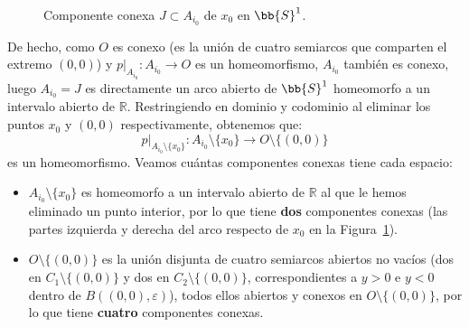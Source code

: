 \documentclass[12pt]{article}
\begin{document}
\begin{ejercicio}
\begin{enumerate}[label=\alph*)]
\begin{figure}[h]
                    \caption{Componente conexa $J\subset A_{i_0}$ de $x_0$ en $\bb{S}^1$.}
                    \label{fig:arco_S1}
                \end{figure}

                De hecho, como $O$ es conexo (es la unión de cuatro semiarcos que comparten el extremo $(0,0)$) y $p\big|_{A_{i_0}}:A_{i_0}\to O$ es un homeomorfismo, $A_{i_0}$ también es conexo, luego $A_{i_0} = J$ es directamente un arco abierto de $\bb{S}^1$ homeomorfo a un intervalo abierto de $\mathbb{R}$. Restringiendo en dominio y codominio al eliminar los puntos $x_0$ y $(0,0)$ respectivamente, obtenemos que:
                \begin{equation*}
                    p\big|_{A_{i_0}\setminus \{x_0\}}:A_{i_0}\setminus \{x_0\}\to O\setminus \{(0,0)\}
                \end{equation*}
                es un homeomorfismo. Veamos cuántas componentes conexas tiene cada espacio:
                \begin{itemize}
                    \item $A_{i_0}\setminus \{x_0\}$ es homeomorfo a un intervalo abierto de $\mathbb{R}$ al que le hemos eliminado un punto interior, por lo que tiene \textbf{dos} componentes conexas (las partes izquierda y derecha del arco respecto de $x_0$ en la Figura~\ref{fig:arco_S1}).
                    \item $O\setminus \{(0,0)\}$ es la unión disjunta de cuatro semiarcos abiertos no vacíos (dos en $C_1\setminus \{(0,0)\}$ y dos en $C_2\setminus \{(0,0)\}$, correspondientes a $y>0$ e $y<0$ dentro de $B((0,0),\varepsilon)$), todos ellos abiertos y conexos en $O\setminus \{(0,0)\}$, por lo que tiene \textbf{cuatro} componentes conexas.
                \end{itemize}


\end{enumerate}
\end{ejercicio}
\end{document}
